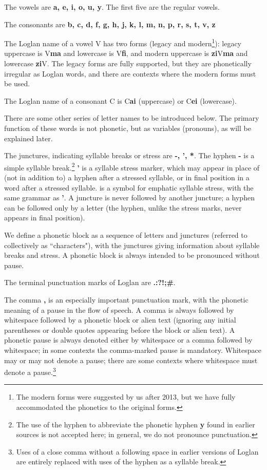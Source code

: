 \documentclass[12pt]{book}
\begin{document}
The vowels are {\bf a, e, i, o, u, y}.  The first five are the regular vowels.

The consonants are   {\bf b, c, d, f, g, h, j, k, l, m, n, p, r, s, t, v, z}

The Loglan name of a vowel V has two forms (legacy and modern\footnote{The modern forms were suggested by us after 2013, but we have fully accommodated the phonetics to the original forms.}):  legacy uppercase is V{\bf ma} and lowercase is V{\bf fi}, and modern uppercase is {\bf zi}V{\bf ma} and lowercase {\bf zi}V.  The legacy forms are fully supported, but they are phonetically irregular as Loglan words, and there are contexts where the modern forms must be used.

The Loglan name of a consonant C is C{\bf ai} (uppercase) or C{\bf ei} (lowercase).

There are some other series of letter names to be introduced below.  The primary function of these words is not phonetic, but as variables (pronouns), as will be explained later.

The junctures, indicating syllable breaks or stress are {\bf -, ', *}.  The hyphen {\bf -} is a simple syllable break.\footnote{The use of the hyphen to abbreviate the phonetic hyphen {\bf y} found in earlier sources is not accepted here;  in general, we do not pronounce punctuation.}  {\bf '} is a syllable stress marker, which may appear in place of (not in addition to) a hyphen after a stressed syllable, or in final position in a word after a stressed syllable.  {\bf *} is a symbol for emphatic syllable stress, with the same grammar as {\bf '}.  A juncture is never followed by another juncture;  a hyphen can be followed only by a letter (the hyphen, unlike the stress marks, never appears in final position).

We define a phonetic block as a sequence of  letters and junctures (referred to collectively as ``characters"), with the junctures giving information about syllable breaks and stress.  A phonetic block is always intended to be pronounced without pause.

The terminal punctuation marks of Loglan are {\bf .:?!;\#}.  

The comma {\bf ,} is an especially important punctuation mark, with the phonetic meaning of a pause in the flow of speech.  A comma is always followed by whitespace followed by a phonetic block or alien text (ignoring any initial parentheses or double quotes appearing before the block or alien text).
A phonetic pause is always denoted either by whitespace or a comma followed by whitespace;  in some contexts the comma-marked pause is mandatory.  Whitespace may or may not denote a pause;  there are some contexts where whitespace must denote a pause.\footnote{Uses of a close comma without a following space in earlier versions of Loglan are entirely replaced with uses of the hyphen as a syllable break.}
\end{document}

